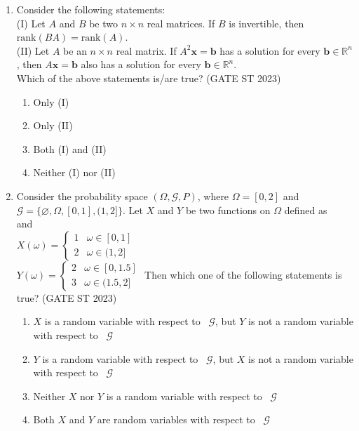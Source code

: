 \documentclass[journal]{IEEEtran}
\begin{document}
\begin{enumerate}[label=\textbf{Q.\arabic*.}, start=1, align=left, itemsep=2em]
\begin{enumerate}[label=\textbf{Q.\arabic*.}, start=11, align=left, itemsep=2em]
\item Consider the following statements: \\

(I) Let $A$ and $B$ be two $n\times n$ real matrices. If $B$ is invertible, then $\mathrm{rank}(BA) = \mathrm{rank}(A)$. \\

(II) Let $A$ be an $n\times n$ real matrix. If $A^2 \mathbf{x} = \mathbf{b}$ has a solution for every $\mathbf{b} \in \mathbb{R}^n$, then $A\mathbf{x} = \mathbf{b}$ also has a solution for every $\mathbf{b} \in \mathbb{R}^n$.\\

Which of the above statements is/are true? \hfill(GATE ST 2023) 
\begin{enumerate}[label=(\Alph*)]
    \item Only (I)
    \item Only (II)
    \item Both (I) and (II)
    \item Neither (I) nor (II)
\end{enumerate}

\item Consider the probability space $(\Omega, \mathcal{G}, P)$, where $\Omega = [0,2]$ and $\mathcal{G} = \{\varnothing, \Omega, [0,1], (1,2]\}$.  
Let $X$ and $Y$ be two functions on $\Omega$ defined as \\

and \\

$X(\omega) = \begin{cases}
1 & \omega \in [0,1] \\
2 & \omega \in (1,2]
\end{cases}$ \\

$Y(\omega) = \begin{cases}
2 & \omega \in [0, 1.5] \\
3 & \omega \in (1.5, 2]
\end{cases}$  
Then which one of the following statements is true?  \hfill(GATE ST 2023)
\begin{enumerate}[label=(\Alph*)]
    \item $X$ is a random variable with respect to \ $\mathcal{G}$, but $Y$ is not a random variable with respect to  \ $\mathcal{G}$
    \item $Y$ is a random variable with respect to \ $\mathcal{G}$, but $X$ is not a random variable with respect to  \ $\mathcal{G}$  
    \item Neither $X$ nor $Y$ is a random variable with respect to \ $\mathcal{G}$  
    \item Both $X$ and $Y$ are random variables with respect to \ $\mathcal{G}$
\end{enumerate}


\end{enumerate}
\end{enumerate}
\end{document}
